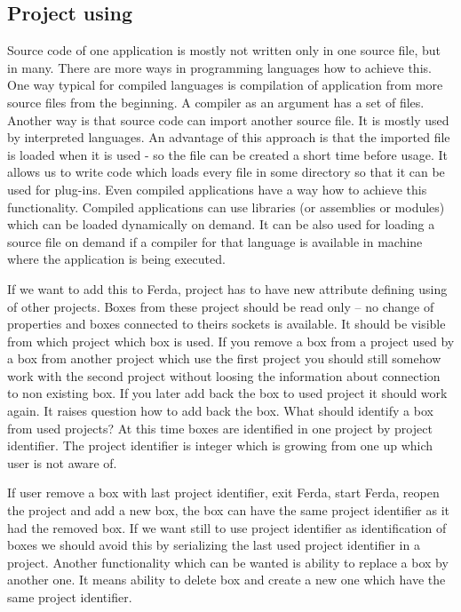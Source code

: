 \documentclass[a4paper,12pt]{book}
\begin{document}

\subsection{Project using}
Source code of one application is mostly not written only in one source file, but in many. There are more ways in programming languages how to achieve this. One way typical for compiled languages is compilation of application from more source files from the beginning. A compiler as an argument has a set of files. Another way is that source code can import another source file. It is mostly used by interpreted languages. An advantage of this approach is that the imported file is loaded when it is used - so the file can be created a short time before usage. It allows us to write code which loads every file in some directory so that it can be used for plug-ins. Even compiled applications have a way how to achieve this functionality. Compiled applications can use libraries (or assemblies or modules) which can be loaded dynamically on demand. It can be also used for loading a source file on demand if a compiler for that language is available in machine where the application is being executed.

If we want to add this to Ferda, project has to have new attribute defining using of other projects. Boxes from these project should be read only -- no change of properties and boxes connected to theirs sockets is available. It should be visible from which project which box is used. If you remove a box from a project used by a box from another project which use the first project you should still somehow work with the second project without loosing the information about connection to non existing box. If you later add back the box to used project it should work again. It raises question how to add back the box. What should identify a box from used projects? At this time boxes are identified in one project by project identifier. The project identifier is integer which is growing from one up which user is not aware of.

If user remove a box with last project identifier, exit Ferda, start Ferda, reopen the project and add a new box, the box can have the same project identifier as it had the removed box. If we want still to use project identifier as identification of boxes we should avoid this by serializing the last used project identifier in a project. Another functionality which can be wanted is ability to replace a box by another one. It means ability to delete box and create a new one which have the same project identifier.
\end{document}
